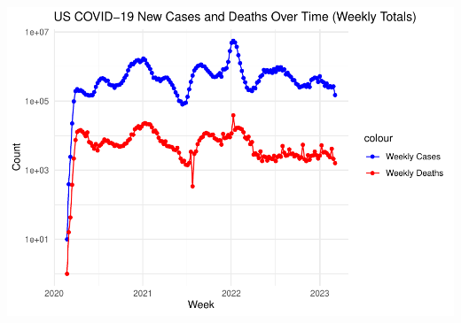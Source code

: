 \documentclass[
]{article}
\begin{document}
\includegraphics{covid-data-analysis_files/figure-latex/us-analysis-1.pdf}
\end{document}
